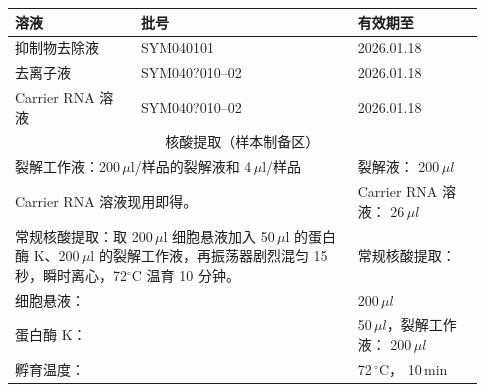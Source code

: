\documentclass[UTF8,10pt,a4paper,fontset=fandol]{ctexart}
\newcommand{\fieldvalue}[1]{#1}
\newcommand{\handwritten}[1]{#1}
\begin{document}
\begin{center}
\begin{tabular}{|p{0.25\linewidth}|p{0.43\linewidth}|p{0.25\linewidth}|}
\hline
溶液 & 批号 & 有效期至\\
\hline
抑制物去除液 &
\fieldvalue{\handwritten{SYM040101}} &
\fieldvalue{\handwritten{2026.01.18}}\\
\hline
去离子液 &
\fieldvalue{\handwritten{SYM040?010--02}} &
\fieldvalue{\handwritten{2026.01.18}}\\
\hline
Carrier RNA 溶液 &
\fieldvalue{\handwritten{SYM040?010--02}} &
\fieldvalue{\handwritten{2026.01.18}}\\
\hline
\multicolumn{3}{|c|}{核酸提取（样本制备区）}\\
\hline
\multicolumn{2}{|l|}{裂解工作液：200\,$\mu$l/样品的裂解液和 4\,$\mu$l/样品} &
裂解液：
\fieldvalue{\handwritten{200}}\,\(\mu l\)\\
\hline
\multicolumn{2}{|l|}{Carrier RNA 溶液现用即得。} &
Carrier RNA 溶液：
\fieldvalue{\handwritten{26}}\,\(\mu l\)\\
\hline
\multicolumn{2}{|p{0.68\linewidth}|}{常规核酸提取：取 200\,$\mu$l 细胞悬液加入 50\,$\mu$l 的蛋白酶 K、200\,$\mu$l 的裂解工作液，再振荡器剧烈混匀 15 秒，瞬时离心，72${}^{\circ}$C 温育 10 分钟。} &
常规核酸提取：\\
\hline
\multicolumn{2}{|l|}{细胞悬液：} &
\fieldvalue{\handwritten{200}}\,\(\mu l\)\\
\hline
\multicolumn{2}{|l|}{蛋白酶 K：} &
\fieldvalue{\handwritten{50}}\,\(\mu l\)，裂解工作液：
\fieldvalue{\handwritten{200}}\,\(\mu l\)\\
\hline
\multicolumn{2}{|l|}{孵育温度：} &
\fieldvalue{\handwritten{72}}\,${}^{\circ}$C，%
\fieldvalue{\handwritten{10}}\,min\\
\hline
\end{tabular}
\end{center}
\end{document}
